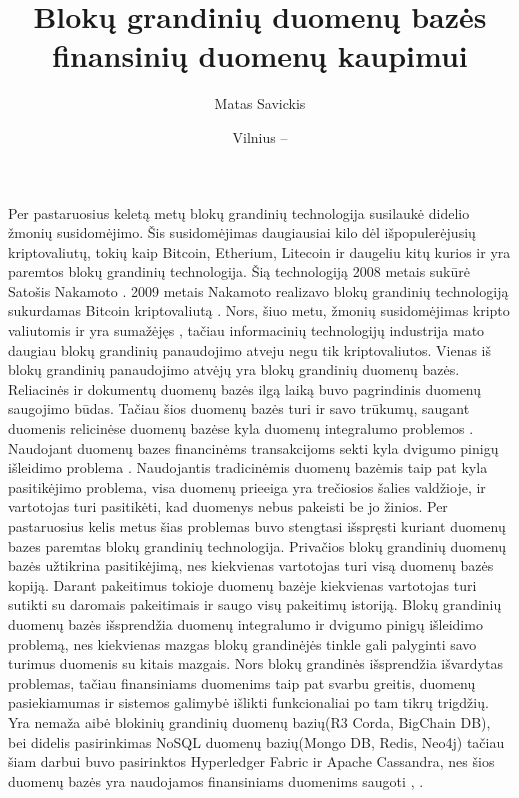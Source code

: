 \documentclass{VUMIFPSkursinis}
\title{Blokų grandinių duomenų bazės finansinių duomenų kaupimui}
\author{Matas Savickis}
\date{Vilnius – \the\year}
\begin{document}
\maketitle
\thispagestyle{empty} 

\tableofcontents

\setcounter{page}{1}
\thispagestyle{empty} 
Per pastaruosius keletą metų blokų grandinių technologija susilaukė didelio žmonių susidomėjimo. 
Šis susidomėjimas daugiausiai kilo dėl išpopulerėjusių kriptovaliutų, tokių kaip Bitcoin, Etherium, Litecoin ir daugeliu kitų 
kurios ir yra paremtos blokų grandinių technologija. Šią technologiją 2008 metais sukūrė Satošis Nakamoto  \cite{BlockChain}. 
2009 metais Nakamoto realizavo blokų grandinių technologiją sukurdamas Bitcoin kriptovaliutą \cite{Bitcoin}. 
Nors, šiuo metu, žmonių susidomėjimas kripto valiutomis ir yra sumažėjęs \cite{Trends}, tačiau informacinių technologijų industrija 
mato daugiau blokų grandinių panaudojimo atveju negu tik kriptovaliutos. Vienas iš blokų grandinių panaudojimo atvėjų yra 
blokų grandinių duomenų bazės. Reliacinės ir dokumentų duomenų bazės ilgą laiką buvo pagrindinis duomenų saugojimo būdas. 
Tačiau šios duomenų bazės turi ir savo trūkumų, saugant duomenis relicinėse duomenų bazėse kyla duomenų integralumo problemos \cite{Integrity}
. 
Naudojant duomenų bazes financinėms transakcijoms sekti kyla dvigumo pinigų išleidimo problema\cite{Double}
. Naudojantis tradicinėmis duomenų bazėmis 
taip pat kyla pasitikėjimo problema, visa duomenų prieeiga yra trečiosios šalies valdžioje, ir vartotojas turi pasitikėti, kad duomenys nebus pakeisti be jo žinios.
Per pastaruosius kelis metus šias problemas
 buvo stengtasi išspręsti kuriant duomenų bazes paremtas blokų grandinių technologija. Privačios blokų grandinių duomenų bazės užtikrina pasitikėjimą, nes kiekvienas vartotojas turi visą duomenų 
bazės kopiją. Darant pakeitimus tokioje duomenų bazėje kiekvienas vartotojas turi sutikti su daromais pakeitimais ir saugo visų pakeitimų istoriją. Blokų grandinių duomenų bazės išsprendžia duomenų integralumo ir
dvigumo pinigų išleidimo problemą, nes kiekvienas mazgas blokų grandinėjės tinkle gali palyginti savo turimus duomenis su kitais mazgais. 
Nors blokų grandinės išsprendžia išvardytas problemas, tačiau finansiniams duomenims taip pat svarbu greitis, duomenų pasiekiamumas ir sistemos galimybė išlikti funkcionaliai po tam tikrų trigdžių. 
Yra nemaža aibė blokinių grandinių duomenų bazių(R3 Corda, BigChain DB), bei didelis pasirinkimas NoSQL duomenų bazių(Mongo DB, Redis, Neo4j) tačiau šiam darbui buvo pasirinktos
Hyperledger Fabric ir Apache Cassandra, nes šios duomenų bazės yra naudojamos finansiniams duomenims saugoti \cite{BnkH} , \cite{BnkC}.
\pagebreak
\end{document}
